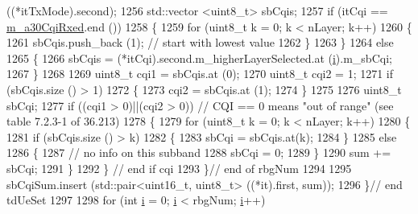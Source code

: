 \begin{DoxyCode}
       ((*itTxMode).second);
1256                       std::vector <uint8\_t> sbCqis;
1257                       \textcolor{keywordflow}{if} (itCqi == \hyperlink{classns3_1_1PssFfMacScheduler_ab1bc511b7c55ead9b2e8ff1e0d4b0e3b}{m\_a30CqiRxed}.end ())
1258                         \{
1259                           \textcolor{keywordflow}{for} (uint8\_t k = 0; k < nLayer; k++)
1260                             \{
1261                               sbCqis.push\_back (1);  \textcolor{comment}{// start with lowest value}
1262                             \}
1263                         \}
1264                       \textcolor{keywordflow}{else}
1265                         \{
1266                           sbCqis = (*itCqi).second.m\_higherLayerSelected.at (\hyperlink{bernuolliDistribution_8m_a6f6ccfcf58b31cb6412107d9d5281426}{i}).m\_sbCqi;
1267                         \}
1268         
1269                       uint8\_t cqi1 = sbCqis.at (0);
1270                       uint8\_t cqi2 = 1;
1271                       \textcolor{keywordflow}{if} (sbCqis.size () > 1)
1272                         \{
1273                           cqi2 = sbCqis.at (1);
1274                         \}
1275             
1276                       uint8\_t sbCqi;
1277                       \textcolor{keywordflow}{if} ((cqi1 > 0)||(cqi2 > 0)) \textcolor{comment}{// CQI == 0 means "out of range" (see table 7.2.3-1 of
       36.213)}
1278                         \{
1279                           \textcolor{keywordflow}{for} (uint8\_t k = 0; k < nLayer; k++) 
1280                             \{
1281                               \textcolor{keywordflow}{if} (sbCqis.size () > k)
1282                                 \{                       
1283                                   sbCqi = sbCqis.at(k);
1284                                 \}
1285                               \textcolor{keywordflow}{else}
1286                                 \{
1287                                   \textcolor{comment}{// no info on this subband }
1288                                   sbCqi = 0;
1289                                 \}
1290                               sum += sbCqi;
1291                             \}
1292                         \}   \textcolor{comment}{// end if cqi}
1293                     \}\textcolor{comment}{// end of rbgNum}
1294               
1295                   sbCqiSum.insert (std::pair<uint16\_t, uint8\_t> ((*it).first, sum));
1296                 \}\textcolor{comment}{// end tdUeSet}
1297         
1298               \textcolor{keywordflow}{for} (\textcolor{keywordtype}{int} \hyperlink{bernuolliDistribution_8m_a6f6ccfcf58b31cb6412107d9d5281426}{i} = 0; \hyperlink{bernuolliDistribution_8m_a6f6ccfcf58b31cb6412107d9d5281426}{i} < rbgNum; \hyperlink{bernuolliDistribution_8m_a6f6ccfcf58b31cb6412107d9d5281426}{i}++)

\end{DoxyCode}
